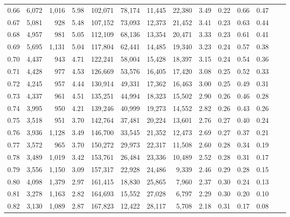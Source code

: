 \begin{tabular}{rrrrrrrrrrrrrr}
0.66 &  6,072 &  1,016 &    5.98 &  102,071 &   78,174 &  11,445 &  22,380 &  3.49 &  0.22 &  0.66 &      0.47 \\
0.67 &  5,081 &    928 &    5.48 &  107,152 &   73,093 &  12,373 &  21,452 &  3.41 &  0.23 &  0.63 &      0.44 \\
0.68 &  4,957 &    981 &    5.05 &  112,109 &   68,136 &  13,354 &  20,471 &  3.33 &  0.23 &  0.61 &      0.41 \\
0.69 &  5,695 &  1,131 &    5.04 &  117,804 &   62,441 &  14,485 &  19,340 &  3.23 &  0.24 &  0.57 &      0.38 \\
0.70 &  4,437 &    943 &    4.71 &  122,241 &   58,004 &  15,428 &  18,397 &  3.15 &  0.24 &  0.54 &      0.36 \\
0.71 &  4,428 &    977 &    4.53 &  126,669 &   53,576 &  16,405 &  17,420 &  3.08 &  0.25 &  0.52 &      0.33 \\
0.72 &  4,245 &    957 &    4.44 &  130,914 &   49,331 &  17,362 &  16,463 &  3.00 &  0.25 &  0.49 &      0.31 \\
0.73 &  4,337 &    961 &    4.51 &  135,251 &   44,994 &  18,323 &  15,502 &  2.90 &  0.26 &  0.46 &      0.28 \\
0.74 &  3,995 &    950 &    4.21 &  139,246 &   40,999 &  19,273 &  14,552 &  2.82 &  0.26 &  0.43 &      0.26 \\
0.75 &  3,518 &    951 &    3.70 &  142,764 &   37,481 &  20,224 &  13,601 &  2.76 &  0.27 &  0.40 &      0.24 \\
0.76 &  3,936 &  1,128 &    3.49 &  146,700 &   33,545 &  21,352 &  12,473 &  2.69 &  0.27 &  0.37 &      0.21 \\
0.77 &  3,572 &    965 &    3.70 &  150,272 &   29,973 &  22,317 &  11,508 &  2.60 &  0.28 &  0.34 &      0.19 \\
0.78 &  3,489 &  1,019 &    3.42 &  153,761 &   26,484 &  23,336 &  10,489 &  2.52 &  0.28 &  0.31 &      0.17 \\
0.79 &  3,556 &  1,150 &    3.09 &  157,317 &   22,928 &  24,486 &   9,339 &  2.46 &  0.29 &  0.28 &      0.15 \\
0.80 &  4,098 &  1,379 &    2.97 &  161,415 &   18,830 &  25,865 &   7,960 &  2.37 &  0.30 &  0.24 &      0.13 \\
0.81 &  3,278 &  1,163 &    2.82 &  164,693 &   15,552 &  27,028 &   6,797 &  2.29 &  0.30 &  0.20 &      0.10 \\
0.82 &  3,130 &  1,089 &    2.87 &  167,823 &   12,422 &  28,117 &   5,708 &  2.18 &  0.31 &  0.17 &      0.08 \\

\end{tabular}
